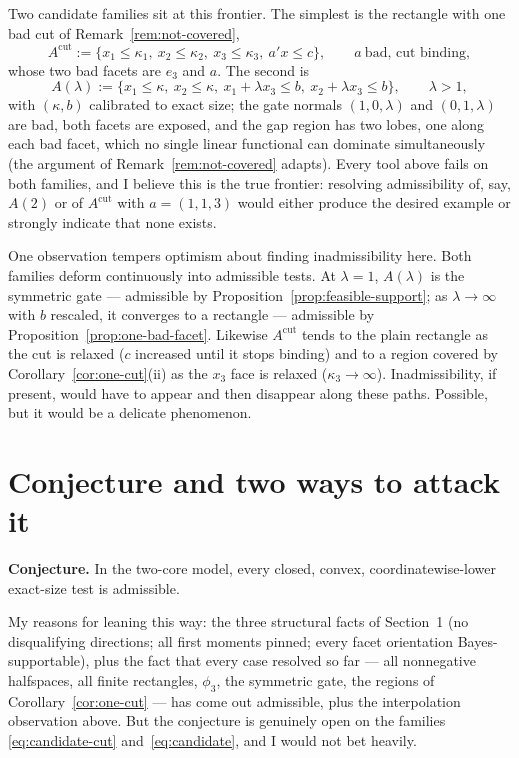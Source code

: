 \documentclass[12pt]{article}
\theoremstyle{remark}
\begin{document}
Two candidate families sit at this frontier. The simplest is the rectangle
with one bad cut of Remark~\ref{rem:not-covered},
\begin{equation}\label{eq:candidate-cut}
A^{\mathrm{cut}}
:=
\{x_1\le\kappa_1,\ x_2\le\kappa_2,\ x_3\le\kappa_3,\ a'x\le c\},
\qquad a\ \text{bad, cut binding},
\end{equation}
whose two bad facets are $e_3$ and $a$. The second is
\begin{equation}\label{eq:candidate}
A(\lambda)
:=
\{x_1\le\kappa,\ x_2\le\kappa,\ x_1+\lambda x_3\le b,\ x_2+\lambda x_3\le b\},
\qquad \lambda>1,
\end{equation}
with $(\kappa,b)$ calibrated to exact size; the gate normals
$(1,0,\lambda)$ and $(0,1,\lambda)$ are bad, both facets are exposed, and
the gap region has two lobes, one along each bad facet, which no single
linear functional can dominate simultaneously (the argument of
Remark~\ref{rem:not-covered} adapts). Every tool above fails on both
families, and I believe this is the true frontier: resolving admissibility
of, say, $A(2)$ or of $A^{\mathrm{cut}}$ with $a=(1,1,3)$ would either
produce the desired example or strongly indicate that none exists.

One observation tempers optimism about finding inadmissibility here. Both
families deform continuously into admissible tests. At $\lambda=1$,
$A(\lambda)$ is the symmetric gate --- admissible by
Proposition~\ref{prop:feasible-support}; as $\lambda\to\infty$ with $b$
rescaled, it converges to a rectangle --- admissible by
Proposition~\ref{prop:one-bad-facet}. Likewise $A^{\mathrm{cut}}$ tends to
the plain rectangle as the cut is relaxed ($c$ increased until it stops
binding) and to a region covered by
Corollary~\ref{cor:one-cut}(ii) as the $x_3$ face is relaxed
($\kappa_3\to\infty$). Inadmissibility, if present, would have to appear
and then disappear along these paths. Possible, but it would be a delicate
phenomenon.

\section{Conjecture and two ways to attack it}

\textbf{Conjecture.} In the two-core model, every closed, convex,
coordinatewise-lower exact-size test is admissible.

My reasons for leaning this way: the three structural facts of Section~1
(no disqualifying directions; all first moments pinned; every facet
orientation Bayes-supportable), plus the fact that every case resolved so
far --- all nonnegative halfspaces, all finite rectangles, $\phi_3$, the
symmetric gate, the regions of Corollary~\ref{cor:one-cut} --- has come out
admissible, plus the interpolation observation above. But the conjecture is
genuinely open on the families \eqref{eq:candidate-cut}
and~\eqref{eq:candidate}, and I would not bet heavily.
\end{document}
